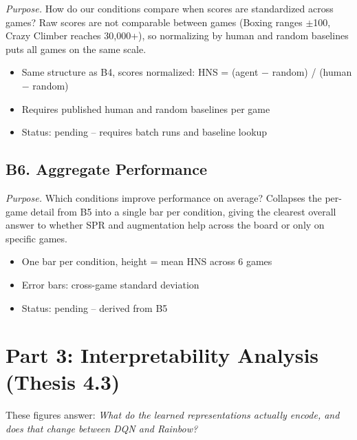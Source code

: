 \documentclass[11pt]{article}
\begin{document}
\noindent\textit{Purpose.} How do our conditions compare when
scores are standardized across games? Raw scores are not
comparable between games (Boxing ranges $\pm$100, Crazy Climber
reaches 30,000+), so normalizing by human and random baselines
puts all games on the same scale.

\begin{itemize}[leftmargin=2em, itemsep=0.1em, topsep=0.3em]
  \item Same structure as B4, scores normalized:
    HNS = (agent $-$ random) / (human $-$ random)
  \item Requires published human and random baselines per game
  \item Status: pending -- requires batch runs and baseline lookup
\end{itemize}

\vspace{0.5em}
\subsection*{B6. Aggregate Performance}

\noindent\textit{Purpose.} Which conditions improve performance
on average? Collapses the per-game detail from B5 into a single
bar per condition, giving the clearest overall answer to whether
SPR and augmentation help across the board or only on specific
games.

\begin{itemize}[leftmargin=2em, itemsep=0.1em, topsep=0.3em]
  \item One bar per condition, height = mean HNS across 6 games
  \item Error bars: cross-game standard deviation
  \item Status: pending -- derived from B5
\end{itemize}

\vspace{0.5em}

\section{Part 3: Interpretability Analysis (Thesis 4.3)}

\noindent These figures answer: \textit{What do the learned
representations actually encode, and does that change between
DQN and Rainbow?}
\end{document}
